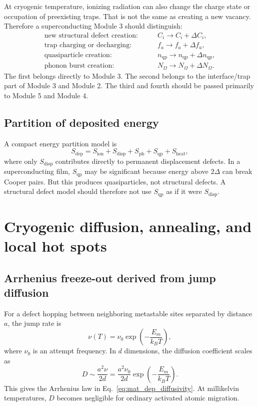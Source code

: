 \documentclass[11pt]{article}
\begin{document}
At cryogenic temperature, ionizing radiation can also change the charge state or occupation of preexisting traps. That is not the same as creating a new vacancy. Therefore a superconducting Module 3 should distinguish:
\begin{align}
\text{new structural defect creation:} &\qquad C_i \rightarrow C_i+\Delta C_i, \\
\text{trap charging or decharging:} &\qquad f_a \rightarrow f_a+\Delta f_a, \\
\text{quasiparticle creation:} &\qquad n_{\mathrm{qp}} \rightarrow n_{\mathrm{qp}}+\Delta n_{\mathrm{qp}}, \\
\text{phonon burst creation:} &\qquad N_{\Omega}\rightarrow N_{\Omega}+\Delta N_{\Omega}. 
\end{align}
The first belongs directly to Module 3. The second belongs to the interface/trap part of Module 3 and Module 2. The third and fourth should be passed primarily to Module 5 and Module 4.

\subsection{Partition of deposited energy}

A compact energy partition model is
\begin{equation}
S_{\mathrm{dep}}
=S_{\mathrm{ion}}+S_{\mathrm{disp}}+S_{\mathrm{ph}}+S_{\mathrm{qp}}+S_{\mathrm{heat}},
\label{eq:energy_partition}
\end{equation}
where only $S_{\mathrm{disp}}$ contributes directly to permanent displacement defects. In a superconducting film, $S_{\mathrm{qp}}$ may be significant because energy above $2\Delta$ can break Cooper pairs. But this produces quasiparticles, not structural defects. A structural defect model should therefore not use $S_{\mathrm{qp}}$ as if it were $S_{\mathrm{disp}}$.

\section{Cryogenic diffusion, annealing, and local hot spots}

\subsection{Arrhenius freeze-out derived from jump diffusion}

For a defect hopping between neighboring metastable sites separated by distance $a$, the jump rate is
\begin{equation}
\nu(T)=\nu_0\exp\left(-\frac{E_m}{k_BT}\right),
\label{eq:jump_rate}
\end{equation}
where $\nu_0$ is an attempt frequency. In $d$ dimensions, the diffusion coefficient scales as
\begin{equation}
D\sim \frac{a^2\nu}{2d}
=\frac{a^2\nu_0}{2d}\exp\left(-\frac{E_m}{k_BT}\right).
\label{eq:jump_diff}
\end{equation}
This gives the Arrhenius law in Eq.~\eqref{eq:mat_dep_diffusivity}. At millikelvin temperatures, $D$ becomes negligible for ordinary activated atomic migration.
\end{document}
